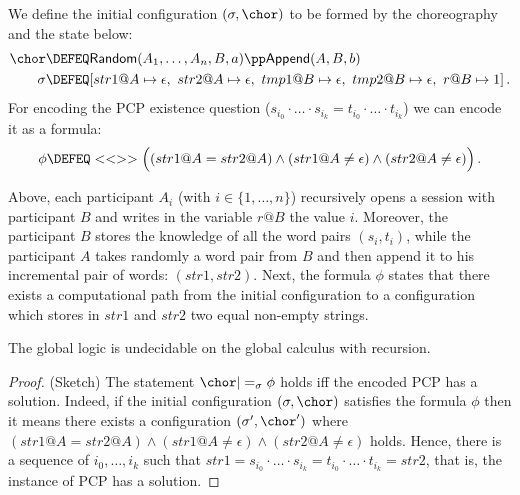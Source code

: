 \begin{definition}
  We define the initial configuration $(\sigma,\chor)$ to be formed by
  the choreography and the state below:
  {\small
  \begin{align*}
    \chor & \DEFEQ
    \textsf{Random}(A_1,\dots,A_n,B,a) \pp  \textsf{Append}(A,B,b) \\
    \sigma & \DEFEQ
    [str1@A \mapsto \epsilon,\ str2@A \mapsto \epsilon,\
    tmp1@B \mapsto \epsilon,\ tmp2@B \mapsto \epsilon,\
    r@B \mapsto 1] \, .
  \end{align*}
  }
  For encoding the PCP existence question ($s_{i_0}\cdot \ldots \cdot
  s_{i_k} = t_{i_0}\cdot \ldots \cdot t_{i_k}$) we can encode it as a
  \GL formula:
  {\small
  \begin{equation*}
    \phi \DEFEQ
    <<>> \Big(
    (str1@A = str2@A) \land
    (str1@A \neq \epsilon) \land
    (str2@A \neq \epsilon)
    \Big) \, .
  \end{equation*}
  }
\end{definition}
\NI Above, each participant $A_i$ (with $i\in \{1,\dots,n\}$)
recursively opens a session with participant $B$ and writes in the
variable $r@B$ the value $i$. Moreover, the participant $B$ stores the
knowledge of all the word pairs $(s_i,t_i)$, while the participant $A$
takes randomly a word pair from $B$ and then append it to his
incremental pair of words: $(str1,str2)$.  Next, the formula $\phi$
states that there exists a computational path from the initial
configuration to a configuration which stores in $str1$ and $str2$ two
equal non-empty strings.

\begin{theorem}
  The global logic is undecidable on the global calculus with
  recursion.
\end{theorem}
\begin{proof} 
  (Sketch) The statement $\chor |=_\sigma \phi$ holds iff the encoded
  PCP has a solution.  Indeed, if the initial configuration
  $(\sigma,\chor)$ satisfies the formula $\phi$ then it means there
  exists a configuration $(\sigma',\chor')$ where $(str1@A = str2@A)
  \land (str1@A \neq \epsilon) \land (str2@A \neq \epsilon)$
  holds. Hence, there is a sequence of $i_0,\dots,i_k$ such that $str1
  = s_{i_0}\cdot \ldots \cdot s_{i_k} = t_{i_0}\cdot \ldots \cdot
  t_{i_k} = str2$, that is, the instance of PCP has a solution.
\end{proof}


